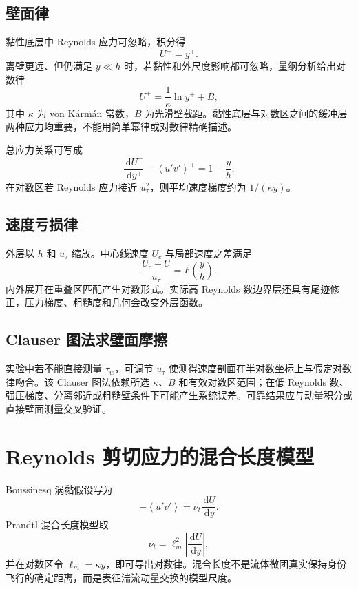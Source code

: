 \documentclass[12pt,a4paper,openany,fontset=none]{ctexbook}
\newcommand{\dd}{\,\mathrm d}
\newcommand{\avg}[1]{\left\langle #1\right\rangle}
\begin{document}
\subsection{壁面律}

黏性底层中 Reynolds 应力可忽略，积分得
\begin{equation}
 U^+=y^+.
\end{equation}
离壁更远、但仍满足 $y\ll h$ 时，若黏性和外尺度影响都可忽略，量纲分析给出对数律
\begin{equation}
 U^+=\frac{1}{\kappa}\ln y^+ + B,
\end{equation}
其中 $\kappa$ 为 von K\'arm\'an 常数，$B$ 为光滑壁截距。黏性底层与对数区之间的缓冲层两种应力均重要，不能用简单幂律或对数律精确描述。

总应力关系可写成
\begin{equation}
 \frac{\dd U^+}{\dd y^+}-\avg{u'v'}^+=1-\frac{y}{h}.
\end{equation}
在对数区若 Reynolds 应力接近 $u_\tau^2$，则平均速度梯度约为 $1/(\kappa y)$。

\subsection{速度亏损律}

外层以 $h$ 和 $u_\tau$ 缩放。中心线速度 $U_c$ 与局部速度之差满足
\begin{equation}
 \frac{U_c-U}{u_\tau}=F\!\left(\frac{y}{h}\right).
\end{equation}
内外展开在重叠区匹配产生对数形式。实际高 Reynolds 数边界层还具有尾迹修正，压力梯度、粗糙度和几何会改变外层函数。

\subsection{Clauser 图法求壁面摩擦}

实验中若不能直接测量 $\tau_w$，可调节 $u_\tau$ 使测得速度剖面在半对数坐标上与假定对数律吻合。该 Clauser 图法依赖所选 $\kappa$、$B$ 和有效对数区范围；在低 Reynolds 数、强压梯度、分离邻近或粗糙壁条件下可能产生系统误差。可靠结果应与动量积分或直接壁面测量交叉验证。

\section{Reynolds 剪切应力的混合长度模型}

Boussinesq 涡黏假设写为
\begin{equation}
 -\avg{u'v'}=\nu_t\frac{\dd U}{\dd y}.
\end{equation}
Prandtl 混合长度模型取
\begin{equation}
 \nu_t=\ell_m^2\left|\frac{\dd U}{\dd y}\right|,
\end{equation}
并在对数区令 $\ell_m=\kappa y$，即可导出对数律。混合长度不是流体微团真实保持身份飞行的确定距离，而是表征湍流动量交换的模型尺度。
\end{document}
